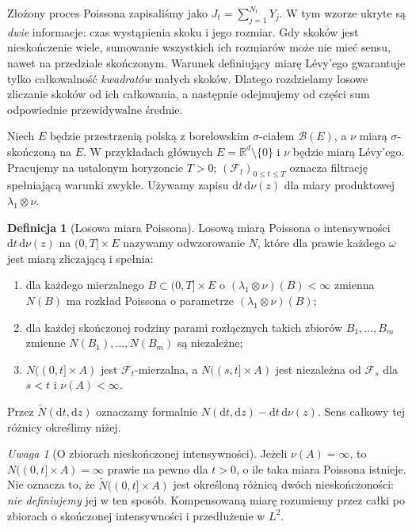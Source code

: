 \documentclass[11pt,a4paper,oneside]{report}
\numberwithin{equation}{chapter}
\theoremstyle{plain}
\theoremstyle{definition}
\newtheorem{definicja}{Definicja}[chapter]
\theoremstyle{remark}
\newtheorem{uwaga}{Uwaga}[chapter]
\newcommand{\R}{\mathbb{R}}
\newcommand{\calF}{\mathcal{F}}
\newcommand{\calB}{\mathcal{B}}
\newcommand{\dd}{\mathrm{d}}
\begin{document}
Złożony proces Poissona zapisaliśmy jako $J_t=\sum_{j=1}^{N_t}Y_j$.
W tym wzorze ukryte są \emph{dwie} informacje: czas wystąpienia
skoku i jego rozmiar. Gdy skoków jest nieskończenie wiele, sumowanie
wszystkich ich rozmiarów może nie mieć sensu, nawet na przedziale
skończonym. Warunek definiujący miarę Lévy'ego gwarantuje tylko
całkowalność \emph{kwadratów} małych skoków. Dlatego rozdzielamy
losowe zliczanie skoków od ich całkowania, a następnie odejmujemy
od części sum odpowiednie przewidywalne średnie.

Niech $E$ będzie przestrzenią polską z borelowskim $\sigma$-ciałem
$\calB(E)$, a $\nu$ miarą $\sigma$-skończoną na $E$.
W przykładach głównych $E=\R^d\setminus\{0\}$ i $\nu$ będzie
miarą Lévy'ego. Pracujemy na ustalonym horyzoncie $T>0$;
$(\calF_t)_{0\le t\le T}$ oznacza filtrację spełniającą warunki
zwykłe. Używamy zapisu $\dd t\,\dd\nu(z)$ dla miary
produktowej $\lambda_1\otimes\nu$.

\begin{definicja}[Losowa miara Poissona]
\label{def:PRM}
Losową miarą Poissona o intensywności $\dd t\,\dd\nu(z)$ na
$(0,T]\times E$ nazywamy odwzorowanie $N$, które dla prawie każdego
$\omega$ jest miarą zliczającą i spełnia:
\begin{enumerate}
\item dla każdego mierzalnego $B\subset(0,T]\times E$ o
$(\lambda_1\otimes\nu)(B)<\infty$ zmienna $N(B)$ ma rozkład
Poissona o parametrze $(\lambda_1\otimes\nu)(B)$;
\item dla każdej skończonej rodziny parami rozłącznych takich
zbiorów $B_1,\ldots,B_m$ zmienne $N(B_1),\ldots,N(B_m)$ są niezależne;
\item $N((0,t]\times A)$ jest $\calF_t$-mierzalna, a
$N((s,t]\times A)$ jest niezależna od $\calF_s$ dla $s<t$
i $\nu(A)<\infty$.
\end{enumerate}
Przez $\widetilde N(\dd t,\dd z)$ oznaczamy formalnie
$N(\dd t,\dd z)-\dd t\,\dd\nu(z)$. Sens całkowy tej różnicy
określimy niżej.
\end{definicja}

\begin{uwaga}[O zbiorach nieskończonej intensywności]
Jeżeli $\nu(A)=\infty$, to $N((0,t]\times A)=\infty$
prawie na pewno dla $t>0$, o ile taka miara Poissona istnieje.
Nie oznacza to, że $\widetilde N((0,t]\times A)$ jest określoną
różnicą dwóch nieskończoności: \emph{nie definiujemy} jej w ten
sposób. Kompensowaną miarę rozumiemy przez całki po zbiorach o
skończonej intensywności i przedłużenie w $L^2$.
\end{uwaga}
\end{document}
